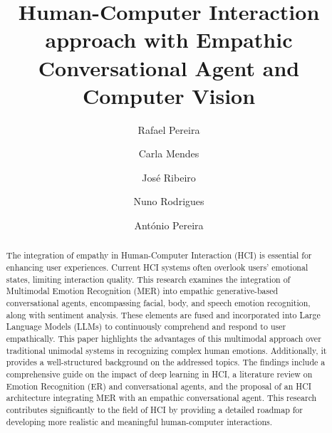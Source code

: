 \documentclass[runningheads]{llncs}
\begin{document}
%
\title{Human-Computer Interaction approach with Empathic Conversational Agent and Computer Vision}
%
%
\author{Rafael Pereira \and
Carla Mendes \and
José Ribeiro \and
Nuno Rodrigues \and
António Pereira}
%
%

%
\maketitle              %
%
\begin{abstract}

The integration of empathy in Human-Computer Interaction (HCI) is essential for enhancing user experiences. Current HCI systems often overlook users' emotional states, limiting interaction quality. This research examines the integration of Multimodal Emotion Recognition (MER) into empathic generative-based conversational agents, encompassing facial, body, and speech emotion recognition, along with sentiment analysis. These elements are fused and incorporated into Large Language Models (LLMs) to continuously comprehend and respond to user empathically. This paper highlights the advantages of this multimodal approach over traditional unimodal systems in recognizing complex human emotions. Additionally, it provides a well-structured background on the addressed topics. The findings include a comprehensive guide on the impact of deep learning in HCI, a literature review on Emotion Recognition (ER) and conversational agents, and the proposal of an HCI architecture integrating MER with an empathic conversational agent. This research contributes significantly to the field of HCI by providing a detailed roadmap for developing more realistic and meaningful human-computer interactions.

\end{abstract}
%
%
%
\end{document}
